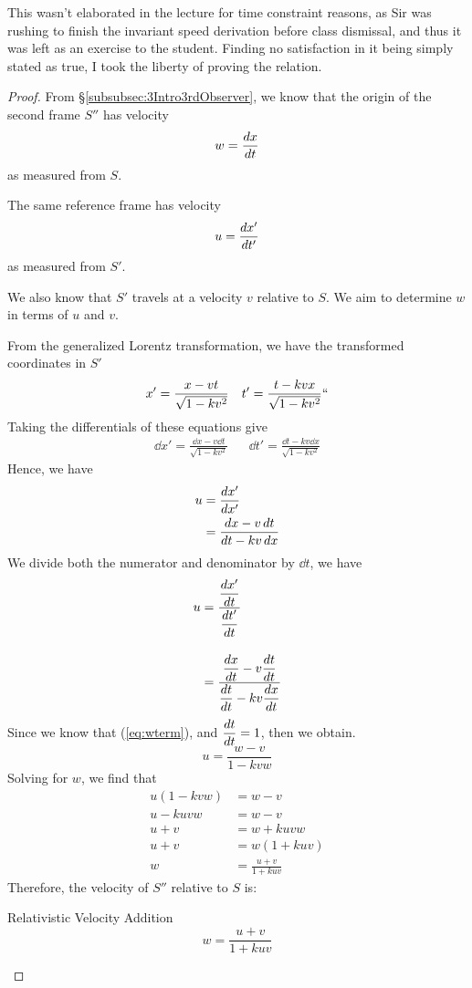 		    This wasn't elaborated in the lecture for time constraint reasons, as Sir was rushing to finish the 
			invariant speed derivation before class dismissal, and thus it was left as an exercise to the student. 
			Finding no satisfaction in it being simply stated as true, I took the liberty of proving the relation.
			\begin{proof}
				From \S \ref{subsubsec:3Intro3rdObserver}, we know that the origin of the second frame
				$S''$ has velocity
				\begin{equation}
					\label{eq:wterm}
					w = \dv{x}{t} 
				\end{equation}
				as measured from $S$.

				The same reference frame has velocity
				\[
					u = \dv{x'}{t'} 
				\]
				as measured from $S'$. 

				We also know that $S'$ travels at a velocity $v$ relative to $S$.
				We aim to determine $w$ in terms of $u$ and $v$. 

				From the generalized Lorentz transformation,
				we have the transformed coordinates in $S'$
				\begin{align*}
					x' = \frac{x - vt}{\sqrt{1-kv^2}} && t' = \frac{t-kvx}{\sqrt{1-kv^2}}`` 
				\end{align*}
				Taking the differentials of these equations give
				\begin{align*}
					\dd{x'} = \frac{\dd{x}-v\dd{t}}{\sqrt{1-kv^2}} && \dd{t'} = \frac{\dd{t}-kv\dd{x}}{\sqrt{1-kv^2}}  
				\end{align*}
				Hence, we have
				\begin{align*}
					u &= \dv{x'}{x'}\\ &= \frac{\dd{x}-v\dd{t}}{\dd{t}-kv\dd{x}}  
				\end{align*}
				We divide both the numerator and denominator by $\dd{t}$, we have
				\begin{align*}
					u &= \frac{\displaystyle\dv{x'}{t}}
					{\displaystyle\dv{t'}{t}} \\[10pt]
					  &= \frac{\displaystyle\dv{x}{t} - v\dv{t}{t}}
					          {\displaystyle\dv{t}{t} - kv \dv{x}{t}}  
				\end{align*}
				Since we know that (\ref{eq:wterm}), and $\displaystyle\dv{t}{t}=1$, then we obtain.
				\begin{equation}
					u = \frac{w-v}{1-kvw} 
				\end{equation}
				Solving for $w$, we find that
				\begin{align*}
					u(1-kvw) &= w-v\\
					u - kuvw &= w-v\\
					u + v &= w + kuvw\\
					u + v &= w(1+kuv)\\
					w &= \frac{u+v}{1+kuv} 
				\end{align*}
				Therefore, the velocity of $S''$ relative to $S$ is:
				\begin{theorem}{Relativistic Velocity Addition}
					\begin{equation}
						w = \frac{u+v}{1+kuv} 
					\end{equation}
				\end{theorem}
			\end{proof}
